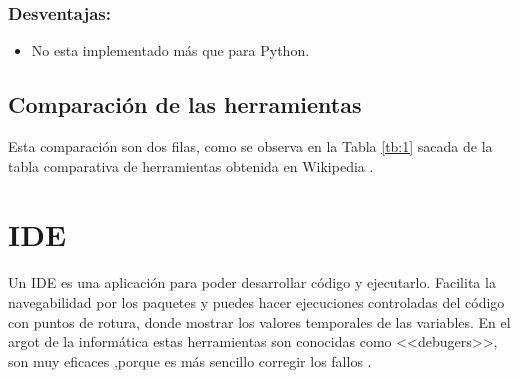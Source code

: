 \subsubsection{Desventajas:}
\begin{itemize}
\item No esta implementado más que para Python.
\end{itemize}

\subsection{Comparación de las herramientas}
Esta comparación son dos filas, como se observa en la Tabla \ref{tb:1} sacada de la tabla comparativa de herramientas obtenida en Wikipedia \cite{Template:table}.


\begin{table}[]
\centering
\caption{Tabla comparativa de herramientas}
\label{tb:1}
\end{table}
\section{IDE}
Un IDE es una aplicación para poder desarrollar código y ejecutarlo. Facilita la navegabilidad por los paquetes y puedes hacer ejecuciones controladas del código con puntos de rotura, donde mostrar los valores temporales de las variables.
En el argot de la informática estas herramientas son conocidas como <<debugers>>, son muy eficaces ,porque es más sencillo corregir los fallos . 

